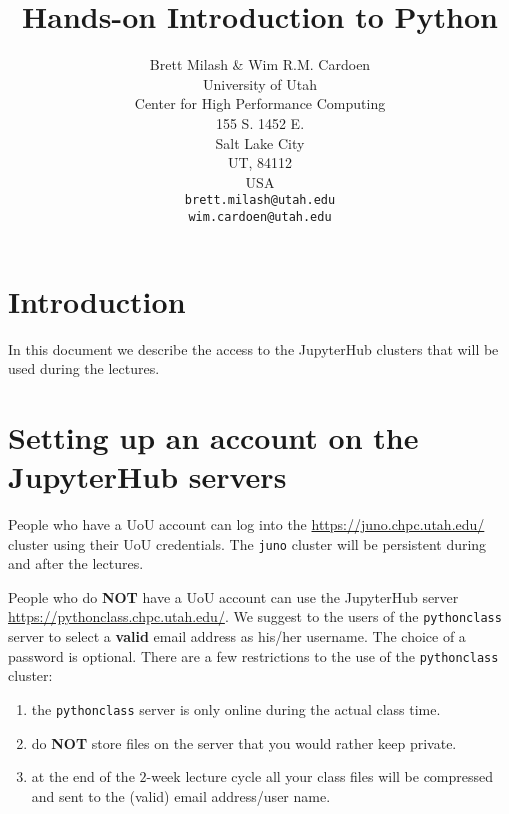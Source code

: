 \documentclass[11pt]{article}
\begin{document}
\title{Hands-on Introduction to Python}
\author{Brett Milash \& Wim R.M. Cardoen\\
        University of Utah\\
        Center for High Performance Computing\\
        155 S. 1452 E.\\
        Salt Lake City\\
        UT, 84112\\
        USA\\
        \texttt{brett.milash@utah.edu}\\
        \texttt{wim.cardoen@utah.edu}}
\renewcommand{\today}{Oct. 15, 2018}
\renewcommand{\labelitemii}{$\star$}
\maketitle

\section*{Introduction}
In this document we describe the access to the JupyterHub clusters
that will be used during the lectures.

\renewcommand \thesection{\Roman{section}}

\section{Setting up an account on the JupyterHub servers}
People who have a UoU account can log into the \href{https://juno.chpc.utah.edu/}{https://juno.chpc.utah.edu/}
cluster using their UoU credentials. The \texttt{juno} cluster will be persistent during and after the lectures.

People who do \textbf{NOT} have a UoU account can use the JupyterHub server 
\href{https://pythonclass.chpc.utah.edu/}{https://pythonclass.chpc.utah.edu/}.
We suggest to the users of the \texttt{pythonclass} server to select a \textbf{valid} 
email address as his/her username. The choice of a password is optional. 
There are a few restrictions to the use of the \texttt{pythonclass} cluster:
\begin{enumerate}
\item the \texttt{pythonclass} server is only online during the actual class time.
\item do \textbf{NOT} store files on the server that you would rather keep private.
\item at the end of the $2$-week lecture cycle all your class files will be compressed and sent to the 
(valid) email address/user name.
\end{enumerate}
\end{document}
